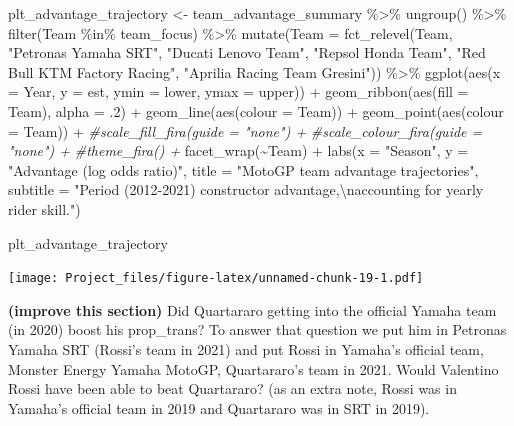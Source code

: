 \documentclass[
]{article}
\newenvironment{Shaded}{\begin{snugshade}}{\end{snugshade}}
\newcommand{\AttributeTok}[1]{\textcolor[rgb]{0.77,0.63,0.00}{#1}}
\newcommand{\CommentTok}[1]{\textcolor[rgb]{0.56,0.35,0.01}{\textit{#1}}}
\newcommand{\DecValTok}[1]{\textcolor[rgb]{0.00,0.00,0.81}{#1}}
\newcommand{\FunctionTok}[1]{\textcolor[rgb]{0.00,0.00,0.00}{#1}}
\newcommand{\NormalTok}[1]{#1}
\newcommand{\OtherTok}[1]{\textcolor[rgb]{0.56,0.35,0.01}{#1}}
\newcommand{\SpecialCharTok}[1]{\textcolor[rgb]{0.00,0.00,0.00}{#1}}
\newcommand{\StringTok}[1]{\textcolor[rgb]{0.31,0.60,0.02}{#1}}
\begin{document}
\begin{Shaded}
\begin{Highlighting}[]
\NormalTok{plt\_advantage\_trajectory }\OtherTok{\textless{}{-}}
\NormalTok{  team\_advantage\_summary }\SpecialCharTok{\%\textgreater{}\%}
  \FunctionTok{ungroup}\NormalTok{() }\SpecialCharTok{\%\textgreater{}\%} 
  \FunctionTok{filter}\NormalTok{(Team }\SpecialCharTok{\%in\%}\NormalTok{ team\_focus) }\SpecialCharTok{\%\textgreater{}\%}
  \FunctionTok{mutate}\NormalTok{(}\AttributeTok{Team =} \FunctionTok{fct\_relevel}\NormalTok{(Team, }\StringTok{"Petronas Yamaha SRT"}\NormalTok{, }\StringTok{"Ducati Lenovo Team"}\NormalTok{, }\StringTok{"Repsol Honda Team"}\NormalTok{, }\StringTok{"Red Bull KTM Factory Racing"}\NormalTok{, }\StringTok{"Aprilia Racing Team Gresini"}\NormalTok{)) }\SpecialCharTok{\%\textgreater{}\%} 
  \FunctionTok{ggplot}\NormalTok{(}\FunctionTok{aes}\NormalTok{(}\AttributeTok{x =}\NormalTok{ Year, }\AttributeTok{y =}\NormalTok{ est, }\AttributeTok{ymin =}\NormalTok{ lower, }\AttributeTok{ymax =}\NormalTok{ upper)) }\SpecialCharTok{+}
  \FunctionTok{geom\_ribbon}\NormalTok{(}\FunctionTok{aes}\NormalTok{(}\AttributeTok{fill =}\NormalTok{ Team), }\AttributeTok{alpha =}\NormalTok{ .}\DecValTok{2}\NormalTok{) }\SpecialCharTok{+}
  \FunctionTok{geom\_line}\NormalTok{(}\FunctionTok{aes}\NormalTok{(}\AttributeTok{colour =}\NormalTok{ Team)) }\SpecialCharTok{+}
  \FunctionTok{geom\_point}\NormalTok{(}\FunctionTok{aes}\NormalTok{(}\AttributeTok{colour =}\NormalTok{ Team)) }\SpecialCharTok{+}
  \CommentTok{\#scale\_fill\_fira(guide = "none") +}
  \CommentTok{\#scale\_colour\_fira(guide = "none") +}
  \CommentTok{\#theme\_fira() +}
  \FunctionTok{facet\_wrap}\NormalTok{(}\SpecialCharTok{\textasciitilde{}}\NormalTok{Team) }\SpecialCharTok{+}
  \FunctionTok{labs}\NormalTok{(}\AttributeTok{x =} \StringTok{"Season"}\NormalTok{, }\AttributeTok{y =} \StringTok{"Advantage (log odds ratio)"}\NormalTok{, }\AttributeTok{title =} \StringTok{"MotoGP team advantage trajectories"}\NormalTok{,}
       \AttributeTok{subtitle =} \StringTok{"Period (2012{-}2021) constructor advantage,}\SpecialCharTok{\textbackslash{}n}\StringTok{accounting for yearly rider skill."}\NormalTok{)}

\NormalTok{plt\_advantage\_trajectory}
\end{Highlighting}
\end{Shaded}

\texttt{[image: Project\_files/figure-latex/unnamed-chunk-19-1.pdf]}

\textbf{(improve this section)} Did Quartararo getting into the official
Yamaha team (in 2020) boost his prop\_trans? To answer that question we
put him in Petronas Yamaha SRT (Rossi's team in 2021) and put Rossi in
Yamaha's official team, Monster Energy Yamaha MotoGP, Quartararo's team
in 2021. Would Valentino Rossi have been able to beat Quartararo? (as an
extra note, Rossi was in Yamaha's official team in 2019 and Quartararo
was in SRT in 2019).
\end{document}
